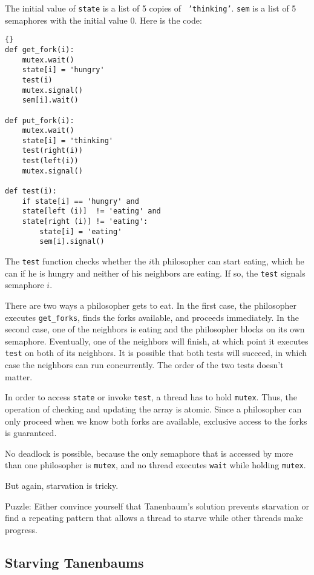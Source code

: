 \documentclass{book}
\newcommand{\clearemptydoublepage}{\newpage\cleardoublepage}
\begin{document}
The initial value of {\tt state} is a list of 5 copies of {\tt
'thinking'}.  {\tt sem} is a list of 5 semaphores with the initial
value 0.  Here is the code:

\begin{lstlisting}[title={Tanenbaum's solution}]{}
def get_fork(i):
    mutex.wait()
    state[i] = 'hungry'
    test(i)
    mutex.signal()
    sem[i].wait()

def put_fork(i):
    mutex.wait()
    state[i] = 'thinking'
    test(right(i))
    test(left(i))
    mutex.signal()

def test(i):
    if state[i] == 'hungry' and
    state[left (i)]  != 'eating' and
    state[right (i)] != 'eating':
        state[i] = 'eating'
        sem[i].signal()
\end{lstlisting}


The {\tt test} function checks whether the $i$th philosopher can
start eating, which he can if he is hungry and
neither of his neighbors are eating.  If so, the {\tt test} signals
semaphore $i$.

There are two ways a philosopher gets to eat.  In the first case, the
philosopher executes {\tt get\_forks}, finds the forks available, and
proceeds immediately.  In the second case, one of the neighbors is
eating and the philosopher blocks on its own semaphore.  Eventually,
one of the neighbors will finish, at which point it executes {\tt
test} on both of its neighbors.  It is possible that both tests
will succeed, in which case the neighbors can run concurrently.
The order of the two tests doesn't matter.

In order to access {\tt state} or invoke {\tt test}, a thread
has to hold {\tt mutex}.  Thus, the operation of checking and
updating the array is atomic.  Since a philosopher can only proceed
when we know both forks are available, exclusive access to the forks
is guaranteed.

No deadlock is possible, because the only semaphore that is accessed
by more than one philosopher is {\tt mutex}, and no thread executes
{\tt wait} while holding {\tt mutex}.

But again, starvation is tricky.

Puzzle: Either convince yourself that Tanenbaum's solution prevents
starvation or find a repeating pattern that allows a thread to starve
while other threads make progress.


\clearemptydoublepage
\subsection{Starving Tanenbaums}
\end{document}
